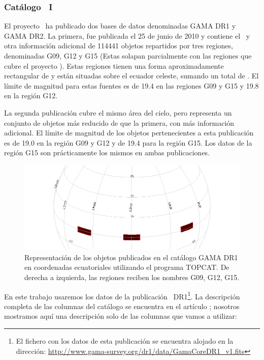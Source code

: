 \subsubsection{Catálogo \gama\ I}

El proyecto \gama\ ha publicado dos bases de datos denominadas GAMA DR1 y GAMA DR2. La primera, fue publicada el 25 de junio de 2010 y contiene el \rt\ y otra información adicional de 114441 objetos repartidos por tres regiones, denominadas G09, G12 y G15 (Estas solapan parcialmente con las regiones que cubre el proyecto \hatlas). Estas regiones tienen una forma aproximadamente rectangular de  y están situadas sobre el ecuador celeste, sumando un total de . El límite de magnitud para estas fuentes es de 19.4 en las regiones G09 y G15 y 19.8 en la región G12.

La segunda publicación cubre el mismo área del cielo, pero representa un conjunto de objetos más reducido de que la primera, con más información adicional. 
El límite de magnitud de los objetos pertenecientes a esta publicación es de 19.0 en la región G09 y G12 y de 19.4 para la región G15. Los datos de la región G15 son prácticamente los mismos en ambas publicaciones. 

\vspace{3mm}

\begin{figure}[htb]
    \begin{center}
         \includegraphics[width=14cm]{2_Muestras/gama.png}
    \end{center}
    
    \caption{\small Representación de los objetos publicados en el catálogo GAMA DR1 en coordenadas ecuatoriales utilizando el programa TOPCAT. De derecha a izquierda, las regiones reciben los nombres G09, G12, G15.} 
    \label{fig:TOPCAT_GAMA}
\end{figure}

En este trabajo usaremos los datos de la publicación \gama\ DR1\footnote{El fichero con los datos de esta publicación se encuentra alojado en la dirección: \url{http://www.gama-survey.org/dr1/data/GamaCoreDR1_v1.fits}}. La descripción completa de las columnas del catálogo se encuentra en el artículo \cite{article:Driver_2011}; nosotros mostramos aquí una descripción solo de las columnas que vamos a utilizar:

